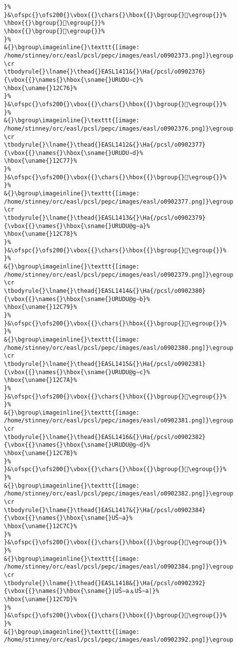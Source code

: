 \begin{verbatim}
}%
}&\ofspc{}\ofs200{}\vbox{{}\chars{}\hbox{{}\bgroup{}𒱳\egroup{}}%
\hbox{{}\bgroup{}𒱴\egroup{}}%
\hbox{{}\bgroup{}𒱵\egroup{}}%
}%
&{}\bgroup\imageinline{}\texttt{[image: /home/stinney/orc/easl/pcsl/pepc/images/easl/o0902373.png]}\egroup
\cr
\tbodyrule{}\lname{}\thead{}EASL1411&{}\Ha{/pcsl/o0902376}{\vbox{{}\names{}\hbox{\sname{}URUDU∼c}%
\hbox{\uname{}12C76}%
}%
}&\ofspc{}\ofs200{}\vbox{{}\chars{}\hbox{{}\bgroup{}𒱶\egroup{}}%
}%
&{}\bgroup\imageinline{}\texttt{[image: /home/stinney/orc/easl/pcsl/pepc/images/easl/o0902376.png]}\egroup
\cr
\tbodyrule{}\lname{}\thead{}EASL1412&{}\Ha{/pcsl/o0902377}{\vbox{{}\names{}\hbox{\sname{}URUDU∼d}%
\hbox{\uname{}12C77}%
}%
}&\ofspc{}\ofs200{}\vbox{{}\chars{}\hbox{{}\bgroup{}𒱷\egroup{}}%
}%
&{}\bgroup\imageinline{}\texttt{[image: /home/stinney/orc/easl/pcsl/pepc/images/easl/o0902377.png]}\egroup
\cr
\tbodyrule{}\lname{}\thead{}EASL1413&{}\Ha{/pcsl/o0902379}{\vbox{{}\names{}\hbox{\sname{}URUDU@g∼a}%
\hbox{\uname{}12C78}%
}%
}&\ofspc{}\ofs200{}\vbox{{}\chars{}\hbox{{}\bgroup{}𒱸\egroup{}}%
}%
&{}\bgroup\imageinline{}\texttt{[image: /home/stinney/orc/easl/pcsl/pepc/images/easl/o0902379.png]}\egroup
\cr
\tbodyrule{}\lname{}\thead{}EASL1414&{}\Ha{/pcsl/o0902380}{\vbox{{}\names{}\hbox{\sname{}URUDU@g∼b}%
\hbox{\uname{}12C79}%
}%
}&\ofspc{}\ofs200{}\vbox{{}\chars{}\hbox{{}\bgroup{}𒱹\egroup{}}%
}%
&{}\bgroup\imageinline{}\texttt{[image: /home/stinney/orc/easl/pcsl/pepc/images/easl/o0902380.png]}\egroup
\cr
\tbodyrule{}\lname{}\thead{}EASL1415&{}\Ha{/pcsl/o0902381}{\vbox{{}\names{}\hbox{\sname{}URUDU@g∼c}%
\hbox{\uname{}12C7A}%
}%
}&\ofspc{}\ofs200{}\vbox{{}\chars{}\hbox{{}\bgroup{}𒱺\egroup{}}%
}%
&{}\bgroup\imageinline{}\texttt{[image: /home/stinney/orc/easl/pcsl/pepc/images/easl/o0902381.png]}\egroup
\cr
\tbodyrule{}\lname{}\thead{}EASL1416&{}\Ha{/pcsl/o0902382}{\vbox{{}\names{}\hbox{\sname{}URUDU@g∼d}%
\hbox{\uname{}12C7B}%
}%
}&\ofspc{}\ofs200{}\vbox{{}\chars{}\hbox{{}\bgroup{}𒱻\egroup{}}%
}%
&{}\bgroup\imageinline{}\texttt{[image: /home/stinney/orc/easl/pcsl/pepc/images/easl/o0902382.png]}\egroup
\cr
\tbodyrule{}\lname{}\thead{}EASL1417&{}\Ha{/pcsl/o0902384}{\vbox{{}\names{}\hbox{\sname{}UŠ∼a}%
\hbox{\uname{}12C7C}%
}%
}&\ofspc{}\ofs200{}\vbox{{}\chars{}\hbox{{}\bgroup{}𒱼\egroup{}}%
}%
&{}\bgroup\imageinline{}\texttt{[image: /home/stinney/orc/easl/pcsl/pepc/images/easl/o0902384.png]}\egroup
\cr
\tbodyrule{}\lname{}\thead{}EASL1418&{}\Ha{/pcsl/o0902392}{\vbox{{}\names{}\hbox{\sname{}|UŠ∼a﹠UŠ∼a|}%
\hbox{\uname{}12C7D}%
}%
}&\ofspc{}\ofs200{}\vbox{{}\chars{}\hbox{{}\bgroup{}𒱽\egroup{}}%
}%
&{}\bgroup\imageinline{}\texttt{[image: /home/stinney/orc/easl/pcsl/pepc/images/easl/o0902392.png]}\egroup

\end{verbatim}
